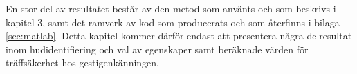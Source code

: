 \documentclass[../rapport_MVEX01-11-05]{subfiles}
\begin{document}
\vspace{-\bigskipamount} %
En stor del av resultatet består av den metod som använts och
som beskrivs i kapitel 3, samt
det ramverk av kod som producerats och som återfinns i bilaga 
\ref{sec:matlab}. Detta kapitel kommer därför endast att presentera
några delresultat inom hudidentifiering och val av egenskaper 
samt beräknade värden för
träffsäkerhet hos gestigenkänningen.
\end{document}
